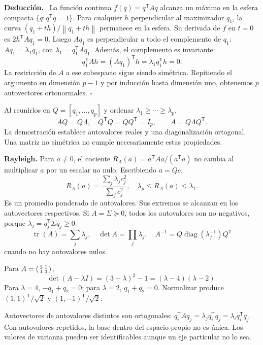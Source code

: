 \documentclass[11pt,a4paper]{article}
\newcommand{\T}{^{\mathsf T}}
\newcommand{\norm}[1]{\left\lVert #1\right\rVert}
\DeclareMathOperator{\tr}{tr}
\DeclareMathOperator{\diag}{diag}
\newenvironment{deduccion}{\par\textbf{Deducción.}\ }{\hfill$\square$\par}
\theoremstyle{definition}\newtheorem{definicion}[teorema]{Definición}
\begin{document}
\begin{deduccion}
La función continua $f(q)=q\T Aq$ alcanza un máximo en la esfera compacta
$\{q:q\T q=1\}$. Para cualquier $h$ perpendicular al maximizador $q_1$,
la curva $(q_1+th)/\norm{q_1+th}$ permanece en la esfera.
Su derivada de $f$ en $t=0$ es $2h\T Aq_1=0$.
Luego $Aq_1$ es perpendicular a todo el complemento de $q_1$:
$Aq_1=\lambda_1q_1$, con $\lambda_1=q_1\T Aq_1$.
Además, el complemento es invariante:
\[
q_1\T Ah=(Aq_1)\T h=\lambda_1q_1\T h=0.
\]
La restricción de $A$ a ese subespacio sigue siendo simétrica.
Repitiendo el argumento en dimensión $p-1$ y por inducción hasta dimensión
uno, obtenemos $p$ autovectores ortonormales.
\end{deduccion}
Al reunirlos en $Q=[q_1,\ldots,q_p]$ y ordenar
$\lambda_1\ge\cdots\ge\lambda_p$,
\[
AQ=Q\Lambda,\quad Q\T Q=QQ\T=I_p,\qquad
\boxed{A=Q\Lambda Q\T}.
\]
La demostración establece autovalores reales y una diagonalización
ortogonal. Una matriz no simétrica no cumple necesariamente estas propiedades.

\textbf{Rayleigh.} Para $a\ne0$, el cociente
$R_A(a)=a\T Aa/(a\T a)$ no cambia al multiplicar $a$ por un escalar
no nulo. Escribiendo $a=Qc$,
\[
R_A(a)=\frac{\sum_j\lambda_jc_j^2}{\sum_jc_j^2},
\quad
\lambda_p\le R_A(a)\le\lambda_1.
\]
Es un promedio ponderado de autovalores. Sus extremos se alcanzan en
los autovectores respectivos. Si $A=\Sigma\succeq0$,
todos los autovalores son no negativos, porque
$\lambda_j=q_j\T\Sigma q_j\ge0$.
\[
\tr(A)=\sum_j\lambda_j,\quad \det A=\prod_j\lambda_j,\quad
A^{-1}=Q\diag(\lambda_j^{-1})Q\T
\]
cuando no hay autovalores nulos.

\begin{ejemplo}
Para $A=\begin{psmallmatrix}3&1\\1&3\end{psmallmatrix}$,
\[
\det(A-\lambda I)=(3-\lambda)^2-1
=(\lambda-4)(\lambda-2).
\]
Para $\lambda=4$, $-q_1+q_2=0$; para $\lambda=2$, $q_1+q_2=0$.
Normalizar produce $(1,1)\T/\sqrt2$ y $(1,-1)\T/\sqrt2$.
\end{ejemplo}
Autovectores de autovalores distintos son ortogonales:
$q_i\T Aq_j=\lambda_jq_i\T q_j=\lambda_iq_i\T q_j$.
Con autovalores repetidos, la base dentro del espacio propio no es única.
Los valores de varianza pueden ser identificables aunque un eje particular
no lo sea.
\end{document}
